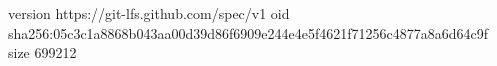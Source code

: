 version https://git-lfs.github.com/spec/v1
oid sha256:05c3c1a8868b043aa00d39d86f6909e244e4e5f4621f71256c4877a8a6d64c9f
size 699212
